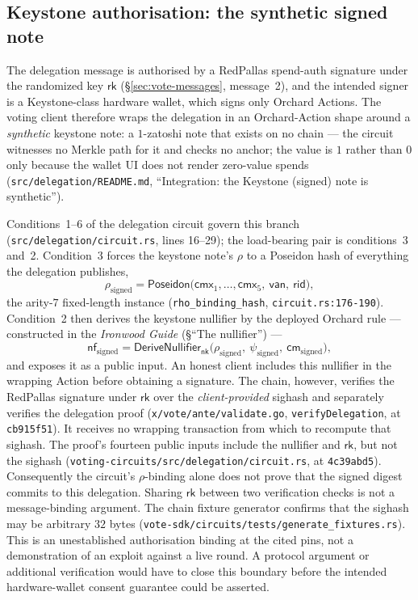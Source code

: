 \documentclass[11pt,a4paper]{article}
\theoremstyle{definition}
\newcommand{\nfsym}{\mathsf{nf}}
\newcommand{\cmsym}{\mathsf{cm}}
\newcommand{\cmx}{\mathsf{cmx}}
\newcommand{\rk}{\mathsf{rk}}
\newcommand{\nksym}{\ensuremath{\mathsf{nk}}}
\begin{document}
\subsection{Keystone authorisation: the synthetic signed note}
\label{sec:vote-keystone}

The delegation message is authorised by a RedPallas spend-auth signature
under the randomized key $\rk$ (\S\ref{sec:vote-messages}, message~2), and
the intended signer is a Keystone-class hardware wallet, which signs only
Orchard Actions. The voting client therefore wraps the delegation in an
Orchard-Action shape around a \emph{synthetic} keystone note: a
$1$-zatoshi note that exists on no chain --- the circuit witnesses no
Merkle path for it and checks no anchor; the value is $1$ rather than $0$
only because the wallet UI does not render zero-value spends
(\texttt{src/delegation/README.md}, ``Integration: the Keystone (signed)
note is synthetic'').

Conditions~1--6 of the delegation circuit govern this branch
(\texttt{src/delegation/circuit.rs}, lines 16--29); the load-bearing pair
is conditions~3 and~2. Condition~3 forces the keystone note's $\rho$ to a
Poseidon hash of everything the delegation publishes,
\[
\rho_{\mathrm{signed}} = \mathsf{Poseidon}\bigl(\cmx_1, \ldots, \cmx_5,\
\mathsf{van},\ \mathsf{rid}\bigr),
\]
the arity-$7$ fixed-length instance (\texttt{rho\_binding\_hash},
\texttt{circuit.rs:176-190}). Condition~2 then derives the keystone
nullifier by the deployed Orchard rule --- constructed in the
\emph{Ironwood Guide} (\S``The nullifier'') ---
\[
\nfsym_{\mathrm{signed}} =
\mathsf{DeriveNullifier}_{\nksym}\bigl(\rho_{\mathrm{signed}},\
\psi_{\mathrm{signed}},\ \cmsym_{\mathrm{signed}}\bigr),
\]
and exposes it as a public input. An honest client includes this
nullifier in the wrapping Action before obtaining a signature. The chain,
however, verifies the RedPallas signature under $\rk$ over the
\emph{client-provided} sighash and separately verifies the delegation
proof (\texttt{x/vote/ante/validate.go}, \texttt{verifyDelegation}, at
\texttt{cb915f51}). It receives no wrapping transaction from which to
recompute that sighash. The proof's fourteen public inputs include the
nullifier and $\rk$, but not the sighash
(\texttt{voting-circuits/src/delegation/circuit.rs}, at
\texttt{4c39abd5}). Consequently the circuit's $\rho$-binding alone does
not prove that the signed digest commits to this delegation. Sharing
$\rk$ between two verification checks is not a message-binding argument.
The chain fixture generator confirms that the sighash may be arbitrary
$32$ bytes (\texttt{vote-sdk/circuits/tests/generate\_fixtures.rs}).
This is an unestablished authorisation binding at the cited pins, not a
demonstration of an exploit against a live round. A protocol argument or
additional verification would have to close this boundary before the
intended hardware-wallet consent guarantee could be asserted.
\end{document}
